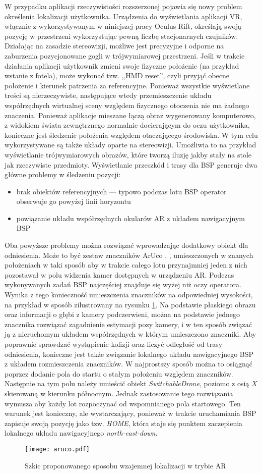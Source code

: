 W przypadku aplikacji rzeczywistości rozszerzonej pojawia się nowy problem określenia lokalizacji użytkownika. Urządzenia do wyświetlania aplikacji VR, włącznie z wykorzystywanym w niniejszej pracy Oculus Rift, określają swoją pozycję w przestrzeni wykorzystując pewną liczbę stacjonarnych czujników. Działając na zasadzie stereowizji, możliwe jest precyzyjne i odporne na zaburzenia pozycjonowane gogli w trójwymiarowej przestrzeni. Jeśli w trakcie działania aplikacji użytkownik zmieni swoje fizyczne położenie (na przykład wstanie z fotela), może wykonać tzw. ,,HMD reset'', czyli przyjąć obecne położenie i kierunek patrzenia za referencyjne. Ponieważ wszystkie wyświetlane treści są nierzeczywiste, następujące wtedy przemieszczenie układu współrzędnych wirtualnej sceny względem fizycznego otoczenia nie ma żadnego znaczenia. Ponieważ aplikacje mieszane łączą obraz wygenerowany komputerowo, z widokiem świata zewnętrznego normalnie docierającym do oczu użytkownika, konieczne jest śledzenie położenia względem otaczającego środowiska. W tym celu wykorzystywane są także układy oparte na stereowizji. Umożliwia to na przykład wyświetlanie trójwymiarowych obrazów, które tworzą iluzję jakby stały na stole jak rzeczywiste przedmioty. Wyświetlanie przeszkód i trasy dla BSP generuje dwa główne problemy w śledzeniu pozycji:
\begin{itemize}
    \item brak obiektów referencyjnych --- typowo podczas lotu BSP operator obserwuje go powyżej linii horyzontu
    \item powiązanie układu współrzędnych okularów AR z układem nawigacyjnym BSP
\end{itemize}

Oba powyższe problemy można rozwiązać wprowadzając dodatkowy obiekt dla odniesienia. Może to być zestaw znaczników ArUco \cite{aruco2016}, \cite{aruco2018}, umieszczonych w znanych położeniach w taki sposób aby w trakcie całego lotu przynajmniej jeden z nich pozostawał w polu widzenia kamer dostępnych w urządzeniu AR. Podczas wykonywanych zadań BSP najczęściej znajduje się wyżej niż oczy operatora. Wynika z tego konieczność umieszczenia znaczników na odpowiedniej wysokości, na przykład w sposób zilustrowany na rysunku \ref{fig:aruco}. Na podstawie płaskiego obrazu oraz informacji o głębi z kamery podczerwieni, można na podstawie jednego znacznika rozwiązać zagadnienie estymacji pozy kamery, i w ten sposób związać ją z nieruchomym układem współrzędnych w którym umieszczono znaczniki. Aby poprawnie sprawdzać wystąpienie kolizji oraz liczyć odległość od trasy odniesienia, konieczne jest także związanie lokalnego układu nawigacyjnego BSP z układem rozmieszczenia znaczników. W najprostszy sposób można to osiągnąć poprzez dodanie pola do startu o stałym położeniu względem znaczników. Następnie na tym polu należy umieścić obiekt \emph{SwitchableDrone}, poziomo z osią $ X $ skierowaną w kierunku północnym. Jednak zastosowanie tego rozwiązania wymusza aby każdy lot rozpoczynać od wspomnianego pola startowego. Ten warunek jest konieczny, ale wystarczający, ponieważ w trakcie uruchamiania BSP zapisuje swoją pozycję jako tzw. \emph{HOME}, która staje się punktem zaczepienia lokalnego układu nawigacyjnego \emph{north-east-down}.

\begin{figure}[!h]
    \centering \texttt{[image: aruco.pdf]}
    \caption{Szkic proponowanego sposobu wzajemnej lokalizacji w trybie AR}
    \label{fig:aruco}
\end{figure}
